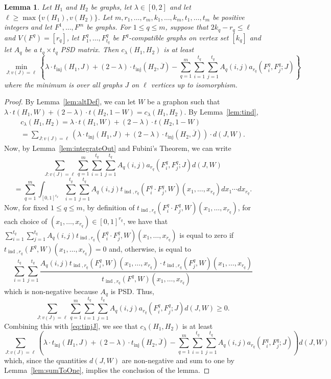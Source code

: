 \documentclass[12pt]{article}
\numberwithin{equation}{section}
\newtheorem{lem}[equation]{Lemma}
\theoremstyle{definition}
\theoremstyle{remark}
\DeclareMathOperator{\inj}{inj}
\DeclareMathOperator{\ind}{ind}
\begin{document}
\begin{lem}
\label{lem:flag}
Let $H_1$ and $H_2$ be graphs, let $\lambda\in [0,2]$ and let $\ell\geq\max\{v(H_1),v(H_2)\}$. Let $m,r_1,\dots,r_m,k_1,\dots,k_m,t_1,\dots,t_m$ be positive integers and let $F^1,\dots,F^m$ be graphs. For $1\leq q\leq m$, suppose that $2k_q-r_q\leq\ell$ and $V(F^q)=[r_q]$, let $F^q_1,\dots,F^q_{t_q}$ be $F^q$-compatible graphs on vertex set $[k_q]$ and let $A_q$ be a $t_q\times t_q$ PSD matrix. Then $c_\lambda(H_1,H_2)$ is at least
\[\min_{J: v(J)=\ell}\left\{\lambda\cdot t_{\inj}(H_1,J)+(2-\lambda)\cdot t_{\inj}(H_2,\overline{J})-\sum_{q=1}^m\sum_{i=1}^{t_q}\sum_{j=1}^{t_q}A_q(i,j)a_{r_q}(F^q_i, F^q_j;J)\right\}\]
where the minimum is over all graphs $J$ on $\ell$ vertices up to isomorphism.
\end{lem}

\begin{proof}
By Lemma~\ref{lem:altDef}, we can let $W$ be a graphon such that $\lambda\cdot t(H_1,W)+(2-\lambda)\cdot t(H_2,1-W)=c_\lambda(H_1,H_2)$. By Lemma~\ref{lem:tind},
\begin{equation}
\label{eq:tinjJ}
\begin{gathered}
c_\lambda(H_1,H_2)=\lambda\cdot t(H_1,W)+(2-\lambda)\cdot t(H_2,1-W)\\=\sum_{J:v(J)=\ell}\left(\lambda \cdot t_{\inj}(H_1,J)+(2-\lambda)\cdot t_{\inj}(H_2,\overline{J})\right)\cdot d(J,W).
\end{gathered}\end{equation}
Now, by Lemma~\ref{lem:integrateOut} and Fubini's Theorem, we can write
\[\sum_{J:v(J)=\ell}\sum_{q=1}^m\sum_{i=1}^{t_q}\sum_{j=1}^{t_q}A_q(i,j)a_{r_q}(F^q_i, F^q_j;J)d(J,W)\]
\[=\sum_{q=1}^m\int_{[0,1]^{r_q}}\sum_{i=1}^{t_q}\sum_{j=1}^{t_q}A_q(i,j)t_{\ind,r_q}(F^q_i\cdot F^q_j,W)(x_1,\dots,x_{r_q})dx_1\cdots dx_{r_q}.\]
Now, for fixed $1\leq q\leq m$, by definition of $t_{\ind,r_q}(F^q_i\cdot F^q_j,W)(x_1,\dots,x_{r_q})$, for each choice of $(x_1,\dots,x_{r_q})\in [0,1]^{r_q}$, we have that $\sum_{i=1}^{t_q}\sum_{j=1}^{t_q}A_q(i,j)t_{\ind,r_q}(F^q_i\cdot F^q_j,W)(x_1,\dots,x_{r_q})$ is equal to zero if $t_{\ind,r_q}(F^q,W)(x_1,\dots,x_{r_q})=0$ and, otherwise, is equal to
\[\sum_{i=1}^{t_q}\sum_{j=1}^{t_q}\frac{A_q(i,j)t_{\ind,r_q}(F_i^q,W)(x_1,\dots,x_{r_q})\cdot t_{\ind,r_q}(F_j^q,W)(x_1,\dots,x_{r_q})}{t_{\ind,r_q}(F^q,W)(x_1,\dots,x_{r_q})}\]
which is non-negative because $A_q$ is PSD. Thus, 
\[
\sum_{J:v(J)=\ell}\sum_{q=1}^m\sum_{i=1}^{t_q}\sum_{j=1}^{t_q}
A_q(i,j)a_{r_q}(F^q_i, F^q_j;J)d(J,W)\geq0.
\]
Combining this with \eqref{eq:tinjJ}, we see that $c_\lambda(H_1,H_2)$ is at least
\[\sum_{J:v(J)=\ell}\left(\lambda\cdot t_{\inj}(H_1,J)+(2-\lambda)\cdot t_{\inj}(H_2,\overline{J})-\sum_{q=1}^m\sum_{i=1}^{t_q}\sum_{j=1}^{t_q}A_q(i,j)a_{r_q}(F^q_i, F^q_j;J)\right)d(J,W) \]
which, since the quantities $d(J,W)$ are non-negative and sum to one by Lemma~\ref{lem:sumToOne}, implies the conclusion of the lemma. 
\end{proof}
\end{document}
